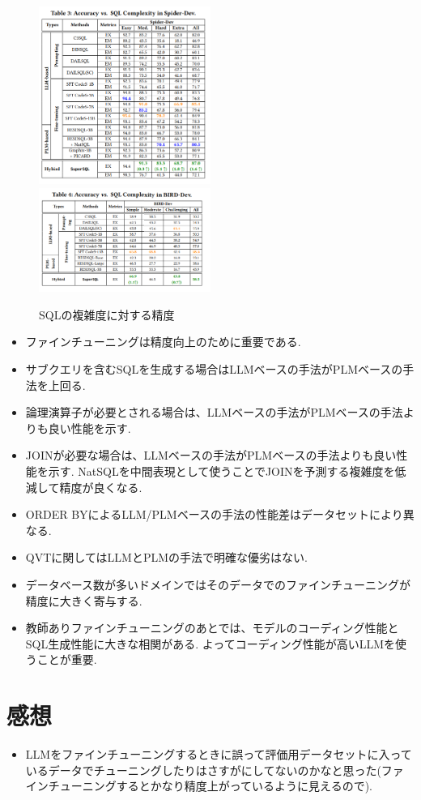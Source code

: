 \documentclass[dvipdfmx,uplatex]{jsarticle}
\theoremstyle{remark}
\newenvironment{experiment}[1]{
    \begin{tcolorbox}[
        colframe=violet,
        colback=violet!10!white,
        colbacktitle=violet!40!white,
        coltitle=black,
        fonttitle=\bfseries,
        title={#1}
    ]
}{
    \end{tcolorbox}
}
\newenvironment{kansou}{
    \begin{tcolorbox}[
        colframe=brown,
        colback=brown!10!white,
        colbacktitle=brown!40!white,
        coltitle=black,fonttitle=\bfseries
    ]
}{
    \end{tcolorbox}
}
\begin{document}
\begin{figure}
    \centering
    \includegraphics[width=0.5\textwidth]{img/dawn-nl2sql/acc-vs-complexity.png}
    \includegraphics[width=0.5\textwidth]{img/dawn-nl2sql/acc-vs-complexity-bird.png}
    \caption{SQLの複雑度に対する精度}
    \label{fig:acc-vs-complexity}
\end{figure}

\begin{experiment}{実験結果から得られた発見}
\begin{itemize}
    \item ファインチューニングは精度向上のために重要である.
    \item サブクエリを含むSQLを生成する場合はLLMベースの手法がPLMベースの手法を上回る.
    \item 論理演算子が必要とされる場合は、LLMベースの手法がPLMベースの手法よりも良い性能を示す.
    \item JOINが必要な場合は、LLMベースの手法がPLMベースの手法よりも良い性能を示す. NatSQLを中間表現として使うことでJOINを予測する複雑度を低減して精度が良くなる.
    \item ORDER BYによるLLM/PLMベースの手法の性能差はデータセットにより異なる.
    \item QVTに関してはLLMとPLMの手法で明確な優劣はない.
    \item データベース数が多いドメインではそのデータでのファインチューニングが精度に大きく寄与する.
    \item 教師ありファインチューニングのあとでは、モデルのコーディング性能とSQL生成性能に大きな相関がある. よってコーディング性能が高いLLMを使うことが重要.
\end{itemize}
\end{experiment}

\section{感想}
\begin{kansou}
\begin{itemize}
  \item LLMをファインチューニングするときに誤って評価用データセットに入っているデータでチューニングしたりはさすがにしてないのかなと思った(ファインチューニングするとかなり精度上がっているように見えるので).
\end{itemize}
\end{kansou}



\end{document}
